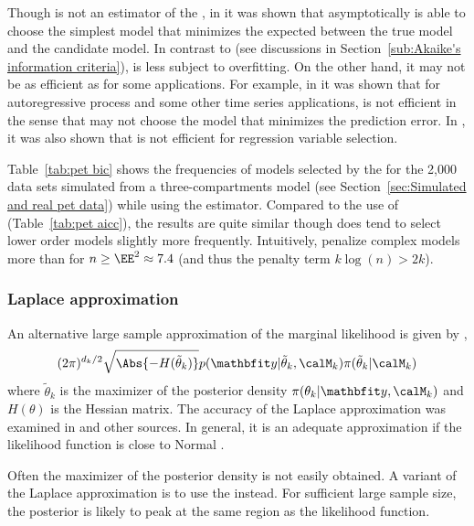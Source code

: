 Though \bic is not an estimator of the \kld, in \cite{Sin:1996vs} it was shown
that asymptotically \bic is able to choose the simplest model that minimizes
the expected \kld between the true model and the candidate model. In contrast
to \aic (see discussions in Section~\ref{sub:Akaike's information criteria}),
\bic is less subject to overfitting. On the other hand, it may not be as
efficient as \aic for some applications. For example, in \cite{Lee:2001tm} it
was shown that for autoregressive process and some other time series
applications, \bic is not efficient in the sense that \bic may not choose the
model that minimizes the prediction error. In
\cite[][sec.~4.7]{Claeskens:2008tq}, it was also shown that \bic is not
efficient for regression variable selection.

Table~\ref{tab:pet bic} shows the frequencies of models selected by the \bic
for the 2,000 \pet data sets simulated from a three-compartments model (see
Section~\ref{sec:Simulated and real pet data}) while using the \nls estimator.
Compared to the use of \aicc (Table~\ref{tab:pet aicc}), the results are quite
similar though \bic does tend to select lower order models slightly more
frequently. Intuitively, \bic penalize complex models more than \aic for
$n\ge\EE^2\approx7.4$ (and thus the penalty term $k\log(n) > 2k$).



\subsubsection{Laplace approximation}
\label{ssub:Laplace approximation}

An alternative large sample approximation of the marginal likelihood is given
by \cite{Tierney:1986vx},
\begin{equation}
  (2\pi)^{d_k/2}\sqrt{\Abs{-H(\tilde\theta_k)}}
  p(\data|\tilde\theta_k,\calM_k)\pi(\tilde\theta_k|\calM_k)
\end{equation}
where $\tilde\theta_k$ is the maximizer of the posterior density
$\pi(\theta_k|\data,\calM_k)$ and $H(\theta)$ is the Hessian matrix. The
accuracy of the Laplace approximation was examined in \cite{Kass:1992tz} and
other sources. In general, it is an adequate approximation if the likelihood
function is close to Normal \cite{Kass:1995vb}.

Often the maximizer of the posterior density is not easily obtained. A
variant of the Laplace approximation is to use the \mle instead. For
sufficient large sample size, the posterior is likely to peak at the same
region as the likelihood function.


